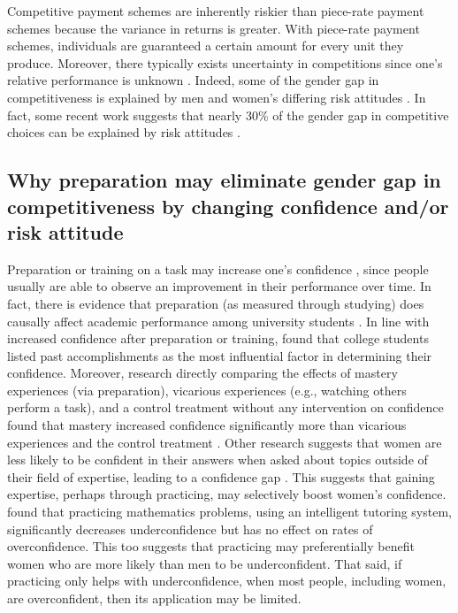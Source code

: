 \documentclass[a4paper, nobind]{templates/ociamthesis}
\begin{document}
Competitive payment schemes are inherently riskier than piece-rate payment schemes because the variance in returns is greater. With piece-rate payment schemes, individuals are guaranteed a certain amount for every unit they produce. Moreover, there typically exists uncertainty in competitions since one's relative performance is unknown \autocite{Niederle2011}. Indeed, some of the gender gap in competitiveness is explained by men and women's differing risk attitudes \autocite{Niederle2011}. In fact, some recent work suggests that nearly 30\% of the gender gap in competitive choices can be explained by risk attitudes \autocite{Gillen2019,Veldhuizen2017}.

\hypertarget{why-preparation-may-eliminate-gender-gap-in-competitiveness-by-changing-confidence-andor-risk-attitude}{%
\subsection{Why preparation may eliminate gender gap in competitiveness by changing confidence and/or risk attitude}\label{why-preparation-may-eliminate-gender-gap-in-competitiveness-by-changing-confidence-andor-risk-attitude}}

Preparation or training on a task may increase one's confidence \autocite{Gist1992,Schunk1981,Schunk1982,Usher2008}, since people usually are able to observe an improvement in their performance over time. In fact, there is evidence that preparation (as measured through studying) does causally affect academic performance among university students \autocite{Stinebrickner2008}. In line with increased confidence after preparation or training, \textcite{Lent1996} found that college students listed past accomplishments as the most influential factor in determining their confidence. Moreover, research directly comparing the effects of mastery experiences (via preparation), vicarious experiences (e.g., watching others perform a task), and a control treatment without any intervention on confidence found that mastery increased confidence significantly more than vicarious experiences and the control treatment \autocite{Bandura1977a}. Other research suggests that women are less likely to be confident in their answers when asked about topics outside of their field of expertise, leading to a confidence gap \autocite{Sarsons2021}. This suggests that gaining expertise, perhaps through practicing, may selectively boost women's confidence. \textcite{Roll2011} found that practicing mathematics problems, using an intelligent tutoring system, significantly decreases underconfidence but has no effect on rates of overconfidence. This too suggests that practicing may preferentially benefit women who are more likely than men to be underconfident. That said, if practicing only helps with underconfidence, when most people, including women, are overconfident, then its application may be limited.
\end{document}
